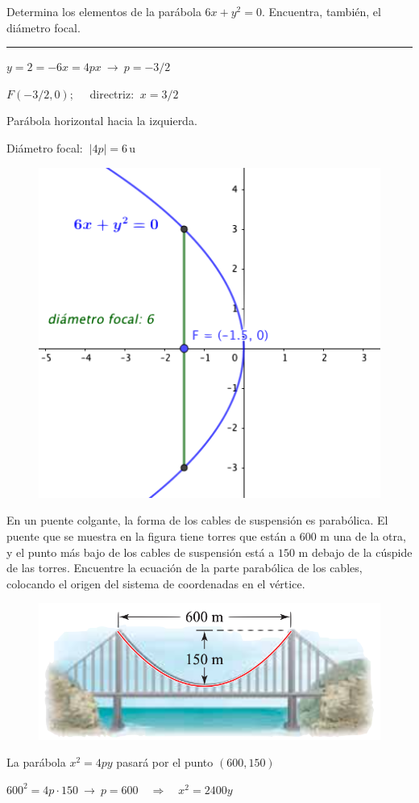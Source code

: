\begin{miejercicio}

\begin{multicols}{2}
Determina los elementos de la parábola $6x+y^2=0$. Encuentra, también, el diámetro focal.

\rule{150pt}{0.1pt}

	\vspace{2mm} $y=2=-6x =4px \ \to \ p=-3/2$
	
	\vspace{2mm} $F(-3/2,0);\quad $ directriz: $\ x=3/2$
	
	\vspace{2mm} Parábola horizontal hacia la izquierda.
	
	\vspace{2mm} Diámetro focal: $\ |4p|=6\,\mathrm{u}$
	\begin{figure}[H]
			\centering
			\includegraphics[width=.35\textwidth]{img-conicas/conicas40.png}
	\end{figure}
\end{multicols}
	
\end{miejercicio}

\begin{miejercicio}

\begin{multicols}{2}
\begin{small} En un puente colgante, la forma de los cables de suspensión es parabólica. El puente que se muestra en la figura tiene torres que están a $600$ m una de la otra, y el punto más bajo de los cables de suspensión está a $150$ m debajo de la cúspide de las torres. Encuentre la ecuación de la parte parabólica de los cables, colocando el origen del sistema de coordenadas en el vértice.	\end{small}
\begin{figure}[H]
			\centering
			\includegraphics[width=.4\textwidth]{img-conicas/conicas41.png}
	\end{figure}
\end{multicols}
 
\vspace{2mm} La parábola $x^2=4py$ pasará por el punto $(600,150)$

\vspace{2mm} $600^2=4p\cdot 150 \ \to \ p=600 \quad \Rightarrow \quad x^2=2400 y$
\end{miejercicio}

